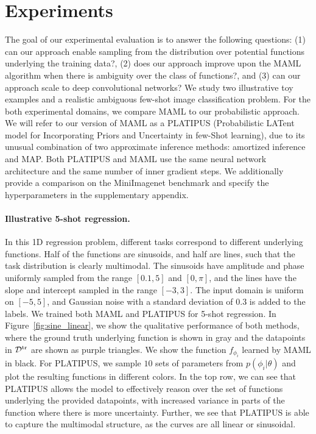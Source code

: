 \documentclass{article}
\begin{document}
 
\vspace{-0.4cm}
\section{Experiments}
\label{sec:experiments}
\vspace{-0.3cm}

The goal of our experimental evaluation is to answer the following questions: (1) can our approach enable sampling from the distribution over potential functions underlying the training data?, (2) does our approach improve upon the MAML algorithm when there is ambiguity over the class of functions?, and (3) can our approach scale to deep convolutional networks? We study two illustrative toy examples and a realistic ambiguous few-shot image classification problem.
For the both experimental domains, we compare MAML to our probabilistic approach. We will refer to our version of MAML as a PLATIPUS (Probabilistic LATent model for Incorporating Priors and Uncertainty in few-Shot learning), due to its unusual combination of two approximate inference methods: amortized inference and MAP.
Both PLATIPUS and MAML use the same neural network architecture and the same number of inner gradient steps.
We additionally provide a comparison on the MiniImagenet benchmark and specify the hyperparameters in the supplementary appendix.


\vspace{-0.1in}
\paragraph{Illustrative 5-shot regression.}
In this 1D regression problem, different tasks correspond to different underlying functions. Half of the functions are sinusoids, and half are lines, such that the task distribution is clearly multimodal. The sinusoids have amplitude and phase uniformly sampled from the range $[0.1,5]$ and $[0,\pi]$, and the lines have the slope and intercept sampled in the range $[-3,3]$. The input domain is uniform on $[-5,5]$, and Gaussian noise with a standard deviation of $0.3$ is added to the labels.
We trained both MAML and PLATIPUS for 5-shot regression.
In Figure~\ref{fig:sine_linear}, we show the qualitative performance of both methods, where the ground truth underlying function is shown in gray and the datapoints in $\mathcal{D}^\text{tr}$ are shown as purple triangles. We show the function $f_{\phi_i}$ learned by MAML in black.
For PLATIPUS, we sample $10$ sets of parameters from $p(\phi_i|\theta)$ and plot the resulting functions in different colors. In the top row, we can see that PLATIPUS allows the model to effectively reason over the set of functions underlying the provided datapoints, with increased variance in parts of the function where there is more uncertainty. Further, we see that PLATIPUS is able to capture the multimodal structure, as the curves are all linear or sinusoidal.
\end{document}
